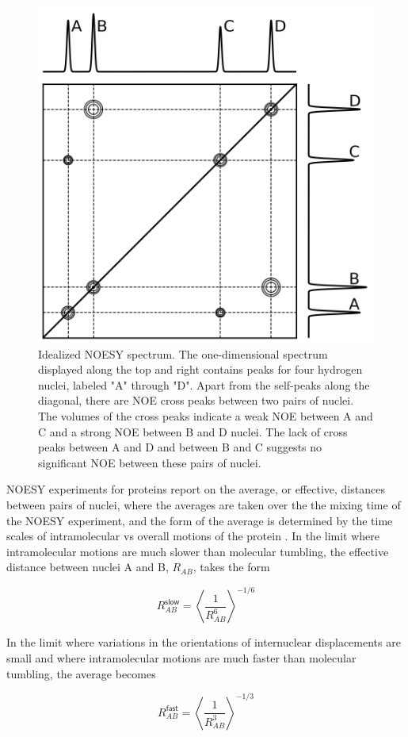 \documentclass[9pt,review]{livecoms}
\begin{document}
\begin{figure}[t]
    \centering
    \includegraphics[width=3 in]{paper/figures/noesy-2d.png}
    \caption{Idealized NOESY spectrum.
    The one-dimensional spectrum displayed along the top and right contains peaks for four hydrogen nuclei, labeled "A" through "D".
    Apart from the self-peaks along the diagonal, there are NOE cross peaks between two pairs of nuclei.
    The volumes of the cross peaks indicate a weak NOE between A and C and a strong NOE between B and D nuclei.
    The lack of cross peaks between A and D and between B and C suggests no significant NOE between these pairs of nuclei.}
    \label{fig:noesy-2d}
\end{figure}

NOESY experiments for proteins report on the average, or effective, distances between pairs of nuclei, where the averages are taken over the the mixing time of the NOESY experiment, and the form of the average is determined by the time scales of intramolecular vs overall motions of the protein \cite{neuhaus_nuclear_2000,vogeli_nuclear_2014}.
In the limit where intramolecular motions are much slower than molecular tumbling, the effective distance between nuclei A and B, $R_{AB}$, takes the form

\begin{equation}
\label{eqn:noe_R_slow}
R_{AB}^{\mathsf{slow}} = \left \langle \frac {1} {R_{AB}^6} \right \rangle^{-1/6}
\end{equation}

\noindent In the limit where variations in the orientations of internuclear displacements are small and where intramolecular motions are much faster than molecular tumbling, the average becomes 

\begin{equation}
\label{eqn:noe_R_fast}
R_{AB}^{\mathsf{fast}} = \left \langle \frac {1} {R_{AB}^3} \right \rangle^{-1/3}
\end{equation}
\end{document}

